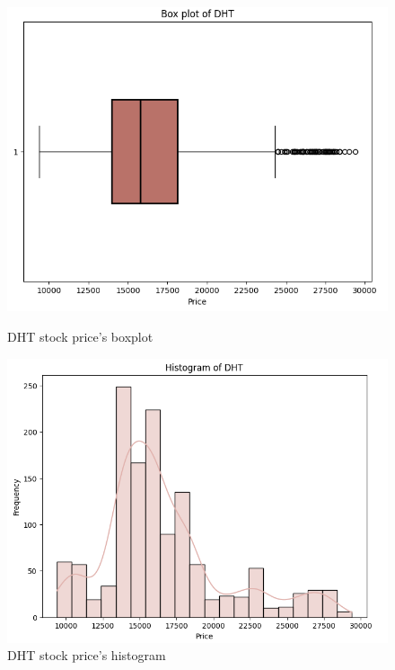 \documentclass{ieeeojies}
\begin{document}
\begin{figure}[H]
    \centering
    \begin{minipage}{0.23\textwidth}
    \centering
    \includegraphics[width=1\textwidth]{bibliography/Figure/DHTboxplot.png}
    \caption{DHT stock price's boxplot}
    \label{fig:1}
    \end{minipage}
    \hfill
    \begin{minipage}{0.23\textwidth}
    \centering
    \includegraphics[width=1\textwidth]{bibliography/Figure/DHThist.png}
    \caption{DHT stock price's histogram}
    \label{fig:2}
    \end{minipage}
\end{figure}
\end{document}

